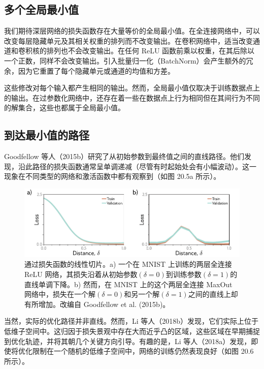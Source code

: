 \documentclass[lang=cn,newtx,10pt,scheme=chinese]{elegantbook}
\begin{document}
\subsection{多个全局最小值}
我们期待深层网络的损失函数存在大量等价的全局最小值。在全连接网络中，可以改变每层隐藏单元及其相关权重的排列而不改变输出。在卷积网络中，适当改变通道和卷积核的排列也不会改变输出。在任何 ReLU 函数前乘以权重，在其后除以一个正数，同样不会改变输出。引入批量归一化（BatchNorm）会产生额外的冗余，因为它重置了每个隐藏单元或通道的均值和方差。

这些修改对每个输入都产生相同的输出。然而，全局最小值仅取决于训练数据点上的输出。在过参数化网络中，还存在着一些在数据点上行为相同但在其间行为不同的解集合，这些也都属于全局最小值。

\subsection{到达最小值的路径}
Goodfellow 等人（2015b）研究了从初始参数到最终值之间的直线路径。他们发现，沿此路径的损失函数通常呈单调递减（尽管有时起始处会有小幅波动）。这一现象在不同类型的网络和激活函数中都有观察到（如图 20.5a 所示）。

\begin{figure}[ht!]
\centering
\includegraphics[width=0.7\linewidth]{PDFFigures/UDLChap21PDF/WhyGoodFellowRoute.pdf}
\caption{通过损失函数的线性切片。a) 一个在 MNIST 上训练的两层全连接 ReLU 网络，其损失沿着从初始参数\((\delta=0)\)到训练参数\((\delta=1)\)的直线单调下降。b) 然而，在 MNIST 上的这个两层全连接 MaxOut 网络中，损失在一个解\((\delta=0)\)和另一个解\((\delta=1)\)之间的直线上却有所增加。改编自 Goodfellow et al. (2015b)。}
\end{figure}

当然，实际的优化路径并非直线。然而，Li 等人（2018b）发现，它们实际上位于低维子空间中。这归因于损失景观中存在大而近乎凸的区域，这些区域在早期捕捉到优化轨迹，并将其朝几个关键方向引导。有趣的是，Li 等人（2018a）发现，即使将优化限制在一个随机的低维子空间中，网络的训练仍然表现良好（如图 20.6 所示）。
\end{document}
